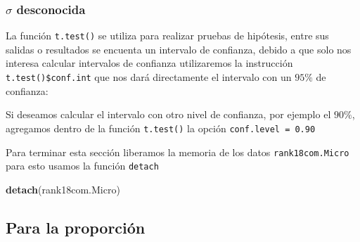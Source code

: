 \documentclass[letterpaper,]{book}
\newenvironment{Shaded}{\begin{snugshade}}{\end{snugshade}}
\newcommand{\CommentTok}[1]{\textcolor[rgb]{0.56,0.35,0.01}{\textit{#1}}}
\newcommand{\DataTypeTok}[1]{\textcolor[rgb]{0.13,0.29,0.53}{#1}}
\newcommand{\FloatTok}[1]{\textcolor[rgb]{0.00,0.00,0.81}{#1}}
\newcommand{\KeywordTok}[1]{\textcolor[rgb]{0.13,0.29,0.53}{\textbf{#1}}}
\newcommand{\NormalTok}[1]{#1}
\newcommand{\OperatorTok}[1]{\textcolor[rgb]{0.81,0.36,0.00}{\textbf{#1}}}
\begin{document}
\hypertarget{musd}{%
\subsubsection{\texorpdfstring{\(\sigma\) desconocida}{\textbackslash{}sigma desconocida}}\label{musd}}

La función \texttt{t.test()} se utiliza para realizar pruebas de hipótesis, entre sus salidas o resultados se encuenta un intervalo de confianza, debido a que solo nos interesa calcular intervalos de confianza utilizaremos la instrucción \texttt{t.test()\$conf.int} que nos dará directamente el intervalo con un \(95\%\) de confianza:

\begin{Shaded}
\end{Shaded}

Si deseamos calcular el intervalo con otro nivel de confianza, por ejemplo el \(90\%\), agregamos dentro de la función \texttt{t.test()} la opción \texttt{conf.level\ =\ 0.90}

\begin{Shaded}
\end{Shaded}

Para terminar esta sección liberamos la memoria de los datos \texttt{rank18com.Micro} para esto usamos la función \texttt{detach}

\begin{Shaded}
\begin{Highlighting}[]
\KeywordTok{detach}\NormalTok{(rank18com.Micro)}
\end{Highlighting}
\end{Shaded}

\hypertarget{para-la-proporcion}{%
\subsection{Para la proporción}\label{para-la-proporcion}}
\end{document}
